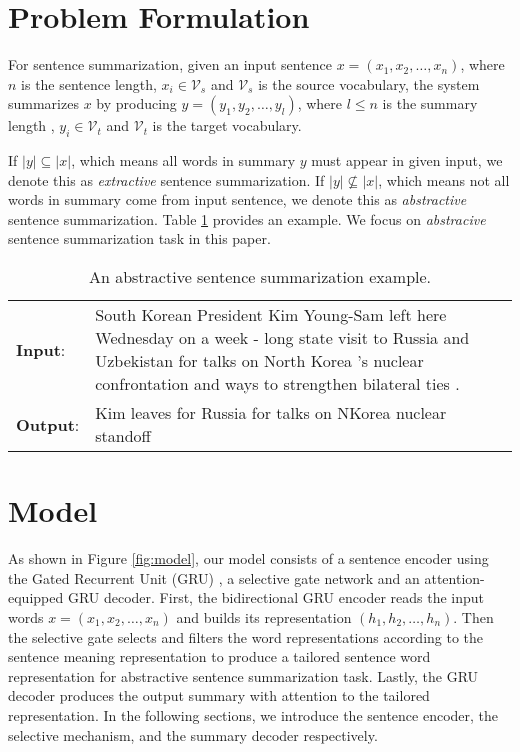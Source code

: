 \documentclass[11pt,a4paper]{article}
\begin{document}
\section{Problem Formulation}
\label{sec:form}


For sentence summarization, given an input sentence $ x = (x_{1}, x_{2}, \dots, x_{n}) $, where $ n $ is the sentence length, $ x_{i} \in \mathcal{V}_{s}  $ and  $ \mathcal{V}_{s} $ is the source vocabulary, the system summarizes $ x $ by producing $ y = (y_{1}, y_{2}, \dots, y_{l}) $, where $ l \leq n $ is the summary length , $ y_{i} \in \mathcal{V}_{t} $ and $ \mathcal{V}_{t} $ is the target vocabulary.

If $ \vert y \vert \subseteq \vert x \vert $, which means all words in summary $ y $ must appear in given input, we denote this as \textit{extractive} sentence summarization.
If $ \vert y \vert \nsubseteq \vert x \vert $, which means not all words in summary come from input sentence, we denote this as \textit{abstractive} sentence summarization. Table \ref{probDefTable} provides an example.
We focus on \textit{abstracive} sentence summarization task in this paper.

\begin{table}[htbp]
	\begin{center}
		\small
		\setlength\extrarowheight{2pt}
		\begin{tabular}{|lp{}|}
			\hline
			\textbf{Input}: & South Korean President Kim Young-Sam left here Wednesday on a week - long state visit to Russia and Uzbekistan for talks on North Korea 's nuclear confrontation and ways to strengthen bilateral ties .\\
			\textbf{Output}: & Kim leaves for Russia for talks on NKorea nuclear standoff \\
			\hline
		\end{tabular}
	\end{center}
	\caption{\label{probDefTable} An abstractive sentence summarization example.}
\end{table}

 
\section{Model}
\label{sec:model}

As shown in Figure \ref{fig:model}, our model consists of a sentence encoder using the Gated Recurrent Unit (GRU) \cite{cho-EtAl:2014:EMNLP2014}, a selective gate network and an attention-equipped GRU decoder.
First, the bidirectional GRU encoder reads the input words $ x = (x_{1}, x_{2}, \dots, x_{n}) $ and builds its representation $ (h_{1}, h_{2}, \dots, h_{n}) $.
Then the selective gate selects and filters the word representations according to the sentence meaning representation to produce a tailored sentence word representation for abstractive sentence summarization task.
Lastly, the GRU decoder produces the output summary with attention to the tailored representation.
In the following sections, we introduce the sentence encoder, the selective mechanism, and the summary decoder respectively.
\end{document}
